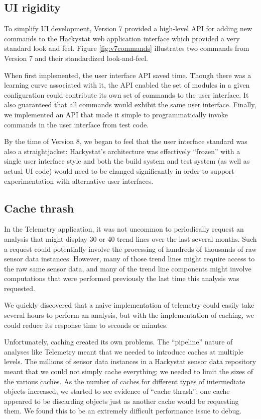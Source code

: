 \documentclass[conference,compsoc,peerreview]{IEEEtran}
\begin{document}
\subsection{UI rigidity}

To simplify UI development, Version 7 provided a high-level API for adding
new commands to the Hackystat web application interface which provided a
very standard look and feel.  Figure \ref{fig:v7commands} illustrates two
commands from Version 7 and their standardized look-and-feel.

When first implemented, the user interface API saved time.  Though there
was a learning curve associated with it, the API enabled the set of modules
in a given configuration could contribute its own set of commands to the
user interface.  It also guaranteed that all commands would exhibit the
same user interface. Finally, we implemented an API that made it simple to
programmatically invoke commands in the user interface from test code.

By the time of Version 8, we began to feel that the user interface standard
was also a straightjacket: Hackystat's architecture was effectively
``frozen'' with a single user interface style and both the build system and
test system (as well as actual UI code) would need to be changed
significantly in order to support experimentation with alternative user
interfaces.

\subsection{Cache thrash}

In the Telemetry application, it was not uncommon to periodically request
an analysis that might display 30 or 40 trend lines over the last several
months. Such a request could potentially involve the processing of hundreds of
thousands of raw sensor data instances. However, many of those trend lines
might require access to the raw same sensor data, and many of the trend
line components might involve computations that were performed previously
the last time this analysis was requested.

We quickly discovered that a naive implementation of telemetry could
easily take several hours to perform an analysis, but with the
implementation of caching, we could reduce its response time to seconds or
minutes.

Unfortunately, caching created its own problems. The ``pipeline'' nature of
analyses like Telemetry meant that we needed to introduce caches at
multiple levels.  The millions of sensor data instances in a Hackystat
sensor data repository meant that we could not simply cache everything; we
needed to limit the sizes of the various caches.  As the number of caches
for different types of intermediate objects increased, we started to see
evidence of ``cache thrash'': one cache appeared to be discarding objects
just as another cache would be requesting them. We found this to be an
extremely difficult performance issue to debug.
\end{document}
